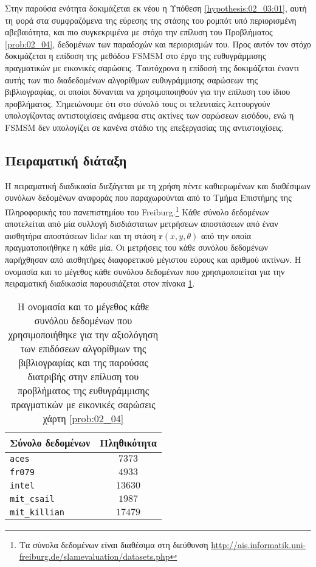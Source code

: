 Στην παρούσα ενότητα δοκιμάζεται εκ νέου η Υπόθεση \ref{hypothesis:02_03:01},
αυτή τη φορά στα συμφραζόμενα της εύρεσης της στάσης του ρομπότ υπό
περιορισμένη αβεβαιότητα, και πιο συγκεκριμένα με στόχο την επίλυση του
Προβλήματος \ref{prob:02_04}, δεδομένων των παραδοχών και περιορισμών του.
Προς αυτόν τον στόχο δοκιμάζεται η επίδοση της μεθόδου FSMSM στο έργο της
ευθυγράμμισης πραγματικών με εικονικές σαρώσεις. Ταυτόχρονα η επίδοσή της
δοκιμάζεται έναντι αυτής των πιο διαδεδομένων αλγορίθμων ευθυγράμμισης σαρώσεων
της βιβλιογραφίας, οι οποίοι δύνανται να χρησιμοποιηθούν για την επίλυση του
ίδιου προβλήματος. Σημειώνουμε ότι στο σύνολό τους οι τελευταίες λειτουργούν
υπολογίζοντας αντιστοιχίσεις ανάμεσα στις ακτίνες των σαρώσεων εισόδου, ενώ η
FSMSM δεν υπολογίζει σε κανένα στάδιο της επεξεργασίας της αντιστοιχίσεις.

\subsection{Πειραματική διάταξη}
\label{subsection:02_04_05:01}

Η πειραματική διαδικασία διεξάγεται με τη χρήση πέντε καθιερωμένων και
διαθέσιμων συνόλων δεδομένων αναφοράς που παραχωρούνται από το Τμήμα Επιστήμης
της Πληροφορικής του πανεπιστημίου του Freiburg.\footnote{Τα σύνολα δεδομένων
είναι διαθέσιμα στη διεύθυνση
\url{http://ais.informatik.uni-freiburg.de/slamevaluation/datasets.php}} Κάθε
σύνολο δεδομένων αποτελείται από μία συλλογή δισδιάστατων μετρήσεων
αποστάσεων από έναν αισθητήρα αποστάσεων lidar και τη στάση
$\bm{r}(x,y,\theta)$ από την οποία πραγματοποιήθηκε η κάθε μία. Οι μετρήσεις
του κάθε συνόλου δεδομένων παρήχθησαν από αισθητήρες διαφορετικού μέγιστου
εύρους και αριθμού ακτίνων. Η ονομασία και το μέγεθος κάθε συνόλου δεδομένων
που χρησιμοποιείται για την πειραματική διαδικασία παρουσιάζεται στον πίνακα
\ref{tbl:02:04_05:dataset_sizes}.

\begin{table}\centering
  \begin{tabular}{lc}
  Σύνολο δεδομένων      & Πληθικότητα  \\  \toprule
  \texttt{aces}         & $7373$       \\
  \texttt{fr079}        & $4933$       \\
  \texttt{intel}        & $13630$      \\
  \texttt{mit\_csail}   & $1987$       \\
  \texttt{mit\_killian} & $17479$      \\  \bottomrule
  \end{tabular}
\caption{\small Η ονομασία και το μέγεθος κάθε συνόλου δεδομένων που
         χρησιμοποιήθηκε για την αξιολόγηση των επιδόσεων αλγορίθμων της
         βιβλιογραφίας και της παρούσας διατριβής στην επίλυση του προβλήματος
         της ευθυγράμμισης πραγματικών με εικονικές σαρώσεις χάρτη
         \ref{prob:02_04}}
  \label{tbl:02:04_05:dataset_sizes}
\end{table}

